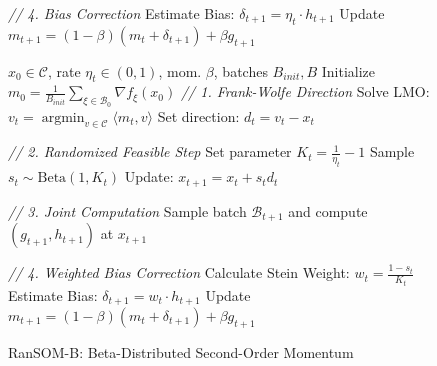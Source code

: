 \documentclass{article}
\theoremstyle{plain}
\theoremstyle{definition}
\theoremstyle{remark}
\DeclareMathOperator{\argmin}{argmin}
\begin{document}
\begin{figure}[t]
\begin{minipage}{0.48\textwidth}
\begin{algorithm}[H]
\begin{algorithmic}[1]
                \STATE \textit{// 4. Bias Correction}
                \STATE Estimate Bias: $\delta_{t+1} = \eta_t \cdot h_{t+1}$ 
                \STATE Update $m_{t+1} = (1-\beta)(m_t + \delta_{t+1}) + \beta g_{t+1}$
                \ENDFOR
            \end{algorithmic}
        \end{algorithm}
    \end{minipage}
    \hfill %
    \begin{minipage}{0.48\textwidth}
        \begin{algorithm}[H]
            \caption{RanSOM-B: Beta-Distributed Second-Order Momentum}
            \label{alg:betasom}
            \begin{algorithmic}[1]
                 $x_0 \in \mathcal{C}$, rate $\eta_t \in (0, 1)$, mom. $\beta$, batches $B_{init},B$
                \STATE Initialize $m_0 = \frac{1}{B_{init}} \sum_{\xi \in \mathcal{B}_0} \nabla f_{\xi}(x_0)$
                \STATE \textit{// 1. Frank-Wolfe Direction}
                \STATE Solve LMO: $v_t = \argmin_{v \in \mathcal{C}} \langle m_t, v \rangle$
                \STATE Set direction: $d_t = v_t - x_t$
                
                \STATE \textit{// 2. Randomized Feasible Step}
                \STATE Set parameter $K_t = \frac{1}{\eta_t} - 1$
                \STATE Sample $s_t \sim \mathrm{Beta}(1, K_t)$ 
                \STATE Update: $x_{t+1} = x_t + s_t d_t$ 
                
                \STATE \textit{// 3. Joint Computation}
                \STATE Sample batch $\mathcal{B}_{t+1}$ and compute $(g_{t+1}, h_{t+1})$ at $x_{t+1}$
                \vspace{2.25em} %
                
                \STATE \textit{// 4. Weighted Bias Correction}
                \STATE Calculate Stein Weight: $w_t = \frac{1-s_t}{K_t}$
                \STATE Estimate Bias: $\delta_{t+1} = w_t \cdot h_{t+1}$
                \STATE Update $m_{t+1} = (1-\beta)(m_t + \delta_{t+1}) + \beta g_{t+1}$
                \ENDFOR
                \vspace{0.35em} %
            \end{algorithmic}
        \end{algorithm}
    \end{minipage}
\end{figure}
\end{document}
